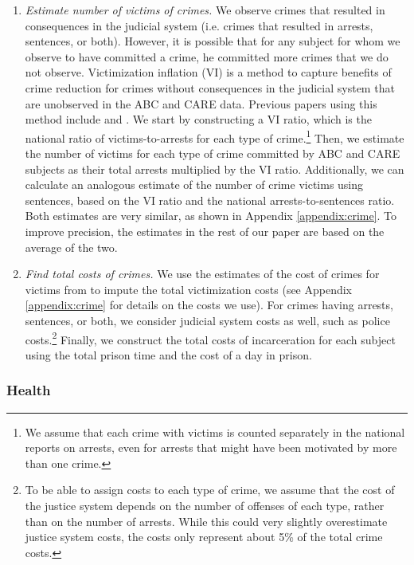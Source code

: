 \begin{enumerate}
\item \textit{Estimate number of victims of crimes.} We observe crimes that resulted in consequences in the judicial system (i.e. crimes that resulted in arrests, sentences, or both). However, it is possible that for any subject for whom we observe to have committed a crime, he committed more crimes that we do not observe. Victimization inflation (VI) is a method to capture benefits of crime reduction for crimes without consequences in the judicial system that are unobserved in the ABC and CARE data. Previous papers using this method include \citet{Belfield_Nores_etal_2006_JHR} and \cite{Heckman_Moon_etal_2010_RateofReturn}. We start by constructing a VI ratio, which is the national ratio of victims-to-arrests for each type of crime.\footnote{We assume that each crime with victims is counted separately in the national reports on arrests, even for arrests that might have been motivated by more than one crime.} Then, we estimate the number of victims for each type of crime committed by ABC and CARE subjects as their total arrests multiplied by the VI ratio. Additionally, we can calculate an analogous estimate of the number of crime victims using sentences, based on the VI ratio and the national arrests-to-sentences ratio. Both estimates are very similar, as shown in Appendix \ref{appendix:crime}. To improve precision, the estimates in the rest of our paper are based on the average of the two.

\item \textit{Find total costs of crimes.} We use the estimates of the cost of crimes for victims from \cite{McCollister_etal_2010_DAD} to impute the total victimization costs (see Appendix \ref{appendix:crime} for details on the costs we use). For crimes having arrests, sentences, or both, we consider judicial system costs as well, such as police costs.\footnote{To be able to assign costs to each type of crime, we assume that the cost of the justice system depends on the number of offenses of each type, rather than on the number of arrests. While this could very slightly overestimate justice system costs, the costs only represent about 5\% of the total crime costs.} Finally, we construct the total costs of incarceration for each subject using the total prison time and the cost of a day in prison.
\end{enumerate}

\subsubsection{Health} \label{section:health}

